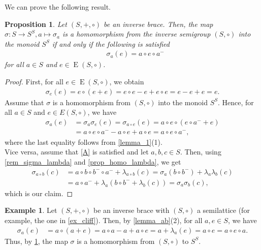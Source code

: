 \documentclass[preprint,1p]{elsarticle}
\newtheorem{prop}[theor]{Proposition}
\theoremstyle{definition}               %
\newtheorem{ex}[theor]{Example}
\DeclareMathOperator{\E}{E}
\begin{document}
\noindent We can prove the following result.
\begin{prop} \label{Aequivsigma}
  Let $(S, +, \circ)$ be an inverse brace. Then, the map $\sigma: S \to S^S, a \mapsto \sigma_a$ is a homomorphism from the inverse semigroup $(S, \circ)$ into the monoid $S^S$
  if and only if the following is satisfied
   \begin{align}\label{A} 
    &\sigma_a(e)=a \circ e \circ a^-\tag{I}
     \end{align}
     for all $a \in S$ and $e \in \E(S,\circ)$.
\end{prop}
\begin{proof}
First, for all $e \in \E(S, \circ)$, we obtain
\begin{align*}
    \sigma_e(e)=e \circ \left(e+e\right)=e \circ e-e+e \circ e=e-e+e=e.
\end{align*}
Assume that $\sigma$ is a homomorphism from $(S,\circ)$ into the monoid $S^S$.  Hence, for all $a\in S$ and $e\in E(S,\circ)$, we have
\begin{align*}
    \sigma_a(e) &=\sigma_a\sigma_e(e)=\sigma_{a\circ e}(e)=a\circ e\circ (e\circ a^-+e)\\
                &= a\circ e\circ a^--a\circ e+ a\circ e=a\circ e\circ a^-,
\end{align*}
where the last equality follows from \cref{lemma_1}(1).\\  
Vice versa, assume that \eqref{A} is satisfied and let $a, b, c \in S$. Then, using \cref{rem_sigma_lambda} and \cref{prop_homo_lambda}, we get
       \begin{align*}
        \sigma_{a \circ b}(c)&=a \circ b \circ b^- \circ a^-+\lambda_{a \circ b}(c)=\sigma_a\left(b \circ b^-\right)+\lambda_a\lambda_b(c) \\
          &=a\circ a^-+\lambda_a\left(b \circ b^- + \lambda_b(c)\right)=\sigma_a\sigma_b(c),
     \end{align*}
   which is our claim.
\end{proof}



\smallskip

\begin{ex}\label{ex_semilattice}
    Let $(S,+,\circ)$ be an inverse brace with $(S, \circ)$ a semilattice (for example, the one in \cref{ex_cliff}). Then, by \cref{lemma_ab}(2), for all $a, e\in S$, we have 
    \begin{align*}
    \sigma_a(e)&=a \circ (a+e)=a \circ a-a+a \circ e=a+\lambda_a(e)=a \circ e=a \circ e  \circ a.
\end{align*}
  Thus, by \cref{Aequivsigma}, the map $\sigma$ is a homomorphism from $(S, \circ)$ to $S^S$.
\end{ex}
\end{document}
